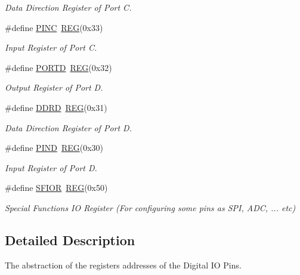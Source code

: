 \begin{DoxyCompactItemize}
\begin{DoxyCompactList}\small\item\em Data Direction Register of Port C. \end{DoxyCompactList}\item 
\hypertarget{group__DIOMCAL_ga0545e73dc7ae14b1f62293c1feba3983}{\#define \hyperlink{group__DIOMCAL_ga0545e73dc7ae14b1f62293c1feba3983}{P\+I\+N\+C}~\hyperlink{group__MCAL_ga72e45020e46f285689db51c46f273403}{R\+E\+G}(0x33)}\label{group__DIOMCAL_ga0545e73dc7ae14b1f62293c1feba3983}

\begin{DoxyCompactList}\small\item\em Input Register of Port C. \end{DoxyCompactList}\item 
\hypertarget{group__DIOMCAL_ga3e6a2517db4f9cb7c9037adf0aefe79b}{\#define \hyperlink{group__DIOMCAL_ga3e6a2517db4f9cb7c9037adf0aefe79b}{P\+O\+R\+T\+D}~\hyperlink{group__MCAL_ga72e45020e46f285689db51c46f273403}{R\+E\+G}(0x32)}\label{group__DIOMCAL_ga3e6a2517db4f9cb7c9037adf0aefe79b}

\begin{DoxyCompactList}\small\item\em Output Register of Port D. \end{DoxyCompactList}\item 
\hypertarget{group__DIOMCAL_gae24189eeb3ce4bccd97d46e88f494e0a}{\#define \hyperlink{group__DIOMCAL_gae24189eeb3ce4bccd97d46e88f494e0a}{D\+D\+R\+D}~\hyperlink{group__MCAL_ga72e45020e46f285689db51c46f273403}{R\+E\+G}(0x31)}\label{group__DIOMCAL_gae24189eeb3ce4bccd97d46e88f494e0a}

\begin{DoxyCompactList}\small\item\em Data Direction Register of Port D. \end{DoxyCompactList}\item 
\hypertarget{group__DIOMCAL_ga50997bc44119b844ceaab463c564bfb7}{\#define \hyperlink{group__DIOMCAL_ga50997bc44119b844ceaab463c564bfb7}{P\+I\+N\+D}~\hyperlink{group__MCAL_ga72e45020e46f285689db51c46f273403}{R\+E\+G}(0x30)}\label{group__DIOMCAL_ga50997bc44119b844ceaab463c564bfb7}

\begin{DoxyCompactList}\small\item\em Input Register of Port D. \end{DoxyCompactList}\item 
\hypertarget{group__DIOMCAL_ga67f09007e073c20a26849fa5fcaf3398}{\#define \hyperlink{group__DIOMCAL_ga67f09007e073c20a26849fa5fcaf3398}{S\+F\+I\+O\+R}~\hyperlink{group__MCAL_ga72e45020e46f285689db51c46f273403}{R\+E\+G}(0x50)}\label{group__DIOMCAL_ga67f09007e073c20a26849fa5fcaf3398}

\begin{DoxyCompactList}\small\item\em Special Functions I\+O Register (For configuring some pins as S\+P\+I, A\+D\+C, ... etc) \end{DoxyCompactList}\end{DoxyCompactItemize}


\subsection{Detailed Description}
The abstraction of the registers addresses of the Digital I\+O Pins. 

